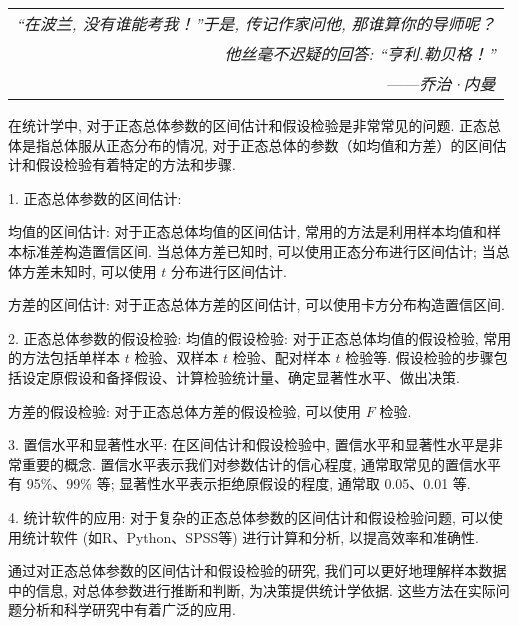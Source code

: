 \begin{flushright}
    \begin{tabular}{r|||}
        \textit{“在波兰, 没有谁能考我！”于是, 传记作家问他, 那谁算你的导师呢？}\\
        \textit{他丝毫不迟疑的回答: “亨利.勒贝格！”}\\
        ——\textit{乔治·内曼}
    \end{tabular}
\end{flushright}

在统计学中, 对于正态总体参数的区间估计和假设检验是非常常见的问题. 正态总体是指总体服从正态分布的情况, 对于正态总体的参数（如均值和方差）的区间估计和假设检验有着特定的方法和步骤. 

1. 正态总体参数的区间估计: 

   均值的区间估计: 对于正态总体均值的区间估计, 常用的方法是利用样本均值和样本标准差构造置信区间. 当总体方差已知时, 可以使用正态分布进行区间估计; 当总体方差未知时, 可以使用 $t$ 分布进行区间估计. 

   方差的区间估计: 对于正态总体方差的区间估计, 可以使用卡方分布构造置信区间. 

2. 正态总体参数的假设检验: 
   均值的假设检验: 对于正态总体均值的假设检验, 常用的方法包括单样本 $t$ 检验、双样本 $t$ 检验、配对样本 $t$ 检验等. 假设检验的步骤包括设定原假设和备择假设、计算检验统计量、确定显著性水平、做出决策. 

   方差的假设检验: 对于正态总体方差的假设检验, 可以使用 $F$ 检验. 

3. 置信水平和显著性水平: 在区间估计和假设检验中, 置信水平和显著性水平是非常重要的概念. 置信水平表示我们对参数估计的信心程度, 通常取常见的置信水平有 95\%、99\% 等; 显著性水平表示拒绝原假设的程度, 通常取 0.05、0.01 等. 

4. 统计软件的应用: 对于复杂的正态总体参数的区间估计和假设检验问题, 可以使用统计软件 (如R、Python、SPSS等) 进行计算和分析, 以提高效率和准确性. 

通过对正态总体参数的区间估计和假设检验的研究, 我们可以更好地理解样本数据中的信息, 对总体参数进行推断和判断, 为决策提供统计学依据. 这些方法在实际问题分析和科学研究中有着广泛的应用. 